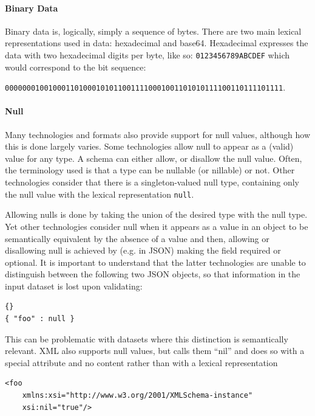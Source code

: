 \paragraph{Binary Data}
Binary data is, logically, simply a sequence of bytes. There are two main lexical representations used in data: hexadecimal and base64. Hexadecimal expresses the data with two hexadecimal digits per byte, like so: \texttt{0123456789ABCDEF} which would correspond to the bit sequence:

\texttt{0000000100100011010001010110011110001001101010111100110111101111}.

\paragraph{Null}
Many technologies and formats also provide support for null values, although how this is done largely varies. Some technologies allow null to appear as a (valid) value for any type. A schema can either allow, or disallow the null value. Often, the terminology used is that a type can be nullable (or nillable) or not. Other technologies consider that there is a singleton-valued null type, containing only the null value with the lexical representation \texttt{null}.

Allowing nulls is done by taking the union of the desired type with the null type. Yet other technologies consider null when it appears as a value in an object to be semantically equivalent by the absence of a value and then, allowing or disallowing null is achieved by (e.g. in JSON) making the field required or optional. It is important to understand that the latter technologies are unable to distinguish between the following two JSON objects, so that information in the input dataset is lost upon validating:

\begin{lstlisting}[style=json, label={lst:jsonnull}]
{}
{ "foo" : null }
\end{lstlisting}

This can be problematic with datasets where this distinction is semantically relevant. XML also supports null values, but calls them “nil” and does so with a special attribute and no content rather than with a lexical representation

\begin{lstlisting}[style=xml, label={lst:xmlnull}]
<foo
    xmlns:xsi="http://www.w3.org/2001/XMLSchema-instance"
    xsi:nil="true"/>
\end{lstlisting}

